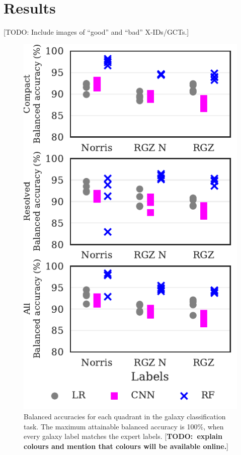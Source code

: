 \documentclass[fleqn,usenatbib,usedcolumn]{mnras}
\newcommand{\todo}[1]{ {\color{red}[{\bf TODO:~{#1}}]} }
\begin{document}
\section{Results}\label{results}

  {[}TODO: Include images of ``good'' and ``bad'' X-IDs/GCTs.{]}
  \begin{figure}
  \centering
  \includegraphics[width=\columnwidth]{images/cdfs_ba_grid.pdf}
  \caption{Balanced accuracies for each quadrant in the galaxy
    classification task. The maximum attainable balanced accuracy is 100\%, when
    every galaxy label matches the expert labels. \todo{explain colours and
    mention that colours will be available online.}\label{fig:ba}}
  \end{figure}
\end{document}
